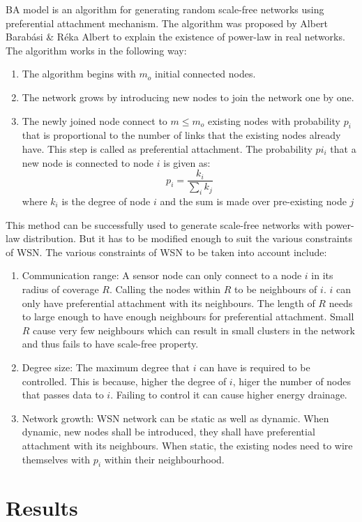 \documentclass{article}
\begin{document}
BA model is an algorithm for generating random scale-free networks using preferential attachment mechanism. The algorithm was proposed by Albert Barab{\'a}si \& R{\'e}ka Albert to explain the existence of power-law in real networks. The algorithm works in the following way:
\begin{enumerate}
\item The algorithm begins with $m_o$ initial connected nodes.
\item The network grows by introducing new nodes to join the network one by one. 
\item The newly joined node connect to $m \leq m_o$ existing nodes with probability $p_i$ that is proportional to the number of links that the existing nodes already have. This step is called as preferential attachment. The probability $pi_i$ that a new node is connected to node $i$ is given as:
		$$p_i = \frac{k_i}{\sum_i{k_j}}$$
where $k_i$ is the degree of node $i$ and the sum is made over pre-existing node $j$
\end{enumerate}
This method can be successfully used to generate scale-free networks with power-law distribution. But it has to be modified enough to suit the various constraints of WSN. The various constraints of WSN to be taken into account include: 
\begin{enumerate}
\item Communication range: A sensor node can only connect to a node $i$ in its radius of coverage $R$. Calling the nodes within $R$ to be neighbours of $i$. $i$ can only have preferential attachment with its neighbours. The length of $R$ needs to large enough to have enough neighbours for preferential attachment. Small $R$ cause very few neighbours which can result in small clusters in the network and thus fails to have scale-free property.
\item Degree size: The maximum degree that $i$ can have is required to be controlled. This is because, higher the degree of $i$, higer the number of nodes that passes data to $i$. Failing to control it can cause higher energy drainage. 
\item Network growth: WSN network can be static as well as dynamic. When dynamic, new nodes shall be introduced, they shall have preferential attachment with its neighbours. When static, the existing nodes need to wire themselves with $p_i$ within their neighbourhood.
\end{enumerate}


\section{Results}
\end{document}
